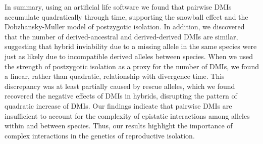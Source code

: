 \begin{doublespace}
%
In summary, using an artificial life software
we found that pairwise DMIs accumulate quadratically through time,
supporting the snowball effect
and the Dob\-zhan\-sky-Mul\-ler model of postzygotic isolation.
%
In addition, we discovered that the number of derived-ancestral 
and derived-derived DMIs are similar,
suggesting that hybrid inviability due to
a missing allele in the same species
were just as likely due to
incompatible derived alleles between species.
%
When we used the strength of postzygotic isolation
as a proxy for the number of DMIs,
we found a linear, rather than quadratic,
relationship with divergence time.
%
This discrepancy was at least partially caused by rescue alleles,
which we found recovered the negative effects of DMIs in hybrids,
disrupting the pattern of quadratic increase of DMIs.
%
Our findings indicate that pairwise DMIs are insufficient
to account for the complexity of epistatic interactions
among alleles within and between species.
%
Thus, our results highlight the importance of complex interactions
in the genetics of reproductive isolation.






%
%
%





\end{doublespace}
